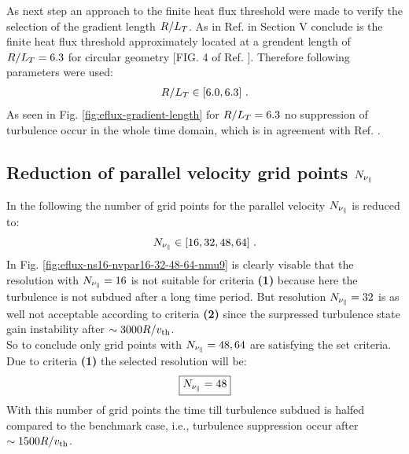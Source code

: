 
As next step an approach to the finite heat flux threshold were made to verify the selection of the gradient length $R/L_T$. As in Ref.  in Section V conclude is the finite heat flux threshold approximately located at a grendent length of $R/L_T = 6.3$ for circular geometry [FIG. 4 of Ref. ]. Therefore following parameters were used:
\begin{gather*}
	R/L_T \in [6.0, 6.3]~.
\end{gather*}
As seen in Fig. \ref{fig:eflux-gradient-length} for $R/L_T = 6.3$ no suppression of turbulence occur in the whole time domain, which is in agreement with Ref. .


\subsection{Reduction of parallel velocity grid points $N_{\nu_\parallel}$}
\label{sub:reduceNvpar}

In the following the number of grid points for the parallel velocity $N_{\nu_\parallel}$ is reduced to:
\begin{gather*}
	N_{\nu_\parallel} \in [16, 32, 48, 64]~.
\end{gather*}
In Fig. \ref{fig:eflux-ns16-nvpar16-32-48-64-nmu9} is clearly visable that the resolution with $N_{\nu_\parallel} = 16$ is not suitable for criteria \textbf{(1)} because here the turbulence is not subdued after a long time period. But resolution $N_{\nu_\parallel} = 32$ is as well not acceptable according to criteria \textbf{(2)} since the surpressed turbulence state gain instability after $\sim 3000 R/v_{\mathrm{th}}$.\\
So to conclude only grid points with $N_{\nu_\parallel} = 48, 64$ are satisfying the set criteria. Due to criteria \textbf{(1)} the selected resolution will be:
\begin{gather*}
	\boxed{N_{\nu_\parallel} = 48}
\end{gather*}
With this number of grid points the time till turbulence subdued is halfed compared to the benchmark case, i.e., turbulence suppression occur after $\sim 1500 R/v_{\mathrm{th}}$.

